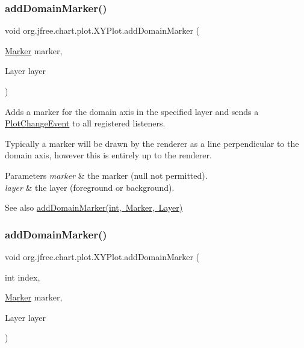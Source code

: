 \subsubsection{\texorpdfstring{add\+Domain\+Marker()}{addDomainMarker()}\hspace{0.1cm}{\footnotesize\ttfamily [2/4]}}
{\footnotesize\ttfamily void org.\+jfree.\+chart.\+plot.\+X\+Y\+Plot.\+add\+Domain\+Marker (\begin{DoxyParamCaption}\item[{\mbox{\hyperlink{classorg_1_1jfree_1_1chart_1_1plot_1_1_marker}{Marker}}}]{marker,  }\item[{Layer}]{layer }\end{DoxyParamCaption})}

Adds a marker for the domain axis in the specified layer and sends a \mbox{\hyperlink{}{Plot\+Change\+Event}} to all registered listeners. 

Typically a marker will be drawn by the renderer as a line perpendicular to the domain axis, however this is entirely up to the renderer.


\begin{DoxyParams}{Parameters}
{\em marker} & the marker ({\ttfamily null} not permitted). \\
\hline
{\em layer} & the layer (foreground or background).\\
\hline
\end{DoxyParams}
\begin{DoxySeeAlso}{See also}
\mbox{\hyperlink{classorg_1_1jfree_1_1chart_1_1plot_1_1_x_y_plot_a1ce4aad5fc259b7fac498fa117ab9f6e}{add\+Domain\+Marker(int, Marker, Layer)}} 
\end{DoxySeeAlso}
\mbox{\label{classorg_1_1jfree_1_1chart_1_1plot_1_1_x_y_plot_a1ce4aad5fc259b7fac498fa117ab9f6e}} 
\subsubsection{\texorpdfstring{add\+Domain\+Marker()}{addDomainMarker()}\hspace{0.1cm}{\footnotesize\ttfamily [3/4]}}
{\footnotesize\ttfamily void org.\+jfree.\+chart.\+plot.\+X\+Y\+Plot.\+add\+Domain\+Marker (\begin{DoxyParamCaption}\item[{int}]{index,  }\item[{\mbox{\hyperlink{classorg_1_1jfree_1_1chart_1_1plot_1_1_marker}{Marker}}}]{marker,  }\item[{Layer}]{layer }\end{DoxyParamCaption})}

